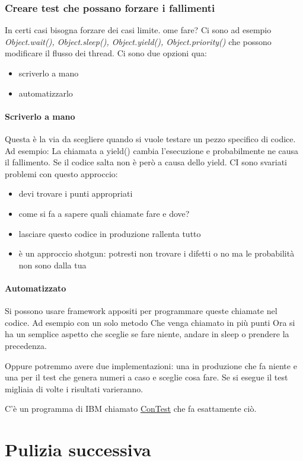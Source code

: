 \documentclass[11pt,a4paper]{book}
\begin{document}
\subsection{Creare test che possano forzare i fallimenti}
In certi casi bisogna forzare dei casi limite. ome fare? Ci sono ad esempio \emph{Object.wait(), Object.sleep(), Object.yield(), Object.priority()} che possono modificare il flusso dei thread. Ci sono due opzioni qua:
\begin{itemize}
	\item scriverlo a mano
	\item automatizzarlo
\end{itemize}

\subsubsection{Scriverlo a mano}
Questa è la via da scegliere quando si vuole testare un pezzo specifico di codice. Ad esempio:
\label{code: 063}
La chiamata a yield() cambia l'esecuzione e probabilmente ne causa il fallimento. Se il codice salta non è però a causa dello yield. CI sono svariati problemi con questo approccio:
\begin{itemize}
	\item devi trovare i punti appropriati
	\item come si fa a sapere quali chiamate fare e dove?
	\item lasciare questo codice in produzione rallenta tutto
	\item è un approccio shotgun: potresti non trovare i difetti o no ma le probabilità non sono dalla tua
\end{itemize}

\subsubsection{Automatizzato}
Si possono usare framework appositi per programmare queste chiamate nel codice. Ad esempio con un solo metodo
\label{code: 064}
Che venga chiamato in più punti
\label{code: 065}
Ora si ha un semplice aspetto che sceglie se fare niente, andare in sleep o prendere la precedenza.

Oppure potremmo avere due implementazioni: una in produzione che fa niente e una per il test che genera numeri a caso e sceglie cosa fare. Se si esegue il test migliaia di volte i risultati varieranno.

C'è un programma di IBM chiamato \href{http://www.alphaworks.ibm.com/tech/contest}{ConTest} che fa esattamente ciò.

\chapter{Pulizia successiva}
\end{document}
